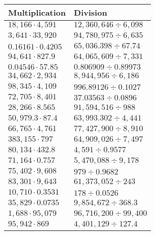 \begin{longtable}[]{@{}ll@{}}
\toprule
Multiplication & Division\tabularnewline
\midrule
\endhead
\(18,166\cdot4,591\) & \(12,360,646÷6,098\)\tabularnewline
\(3,641\cdot 33,920\) & \(94,780,975÷6,635\)\tabularnewline
\(0.16161\cdot0.4205\) & \(65,036.398÷67.74\)\tabularnewline
\(94,641\cdot827.9\) & \(64,065,609÷7,331\)\tabularnewline
\(0.04546\cdot57.85\) & \(0.806909÷0.89973\)\tabularnewline
\(34,662\cdot2,934\) & \(8,944,956÷6,186\)\tabularnewline
\(98,345\cdot4,109\) & \(996.89126÷0.1027\)\tabularnewline
\(72,705\cdot8,401\) & \(37.03563÷0.0896\)\tabularnewline
\(28,266\cdot 8.565\) & \(91,594,516÷988\)\tabularnewline
\(50,979.3\cdot87.4\) & \(63,993.302÷4,441\)\tabularnewline
\(66,765\cdot4,761\) & \(77,427,900÷8,910\)\tabularnewline
\(383,155\cdot797\) & \(64,909,026÷7,497\)\tabularnewline
\(80,134\cdot432.8\) & \(4,591÷0.9577\)\tabularnewline
\(71,164\cdot 0.757\) & \(5,470,088÷9,178\)\tabularnewline
\(75,402\cdot9,608\) & \(979÷0.9682\)\tabularnewline
\(83,301\cdot9,643\) & \(61,373,052÷243\)\tabularnewline
\(10,710\cdot0.3531\) & \(178÷0.0526\)\tabularnewline
\(35,829\cdot0.0735\) & \(9,854,672÷368.3\)\tabularnewline
\(1,688\cdot95,079\) & \(96,716,200÷99,400\)\tabularnewline
\(95,942\cdot869\) & \(4,401,129÷127.4\)\tabularnewline
\bottomrule
\end{longtable}
